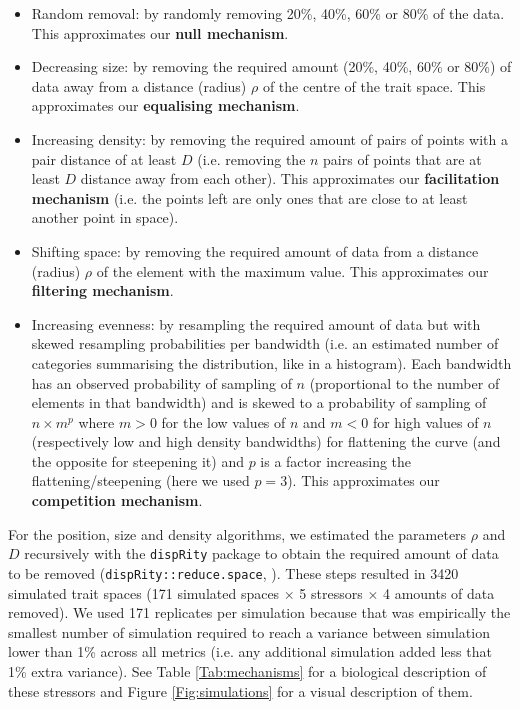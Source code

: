 \documentclass[12pt,letterpaper]{article}
\begin{document}
\begin{itemize}
\item Random removal: by randomly removing 20\%, 40\%, 60\% or 80\% of the data. This approximates our \textbf{null mechanism}.

\item Decreasing size: by removing the required amount (20\%, 40\%, 60\% or 80\%) of data away from a distance (radius)  $\rho$ of the centre of the trait space.
This approximates our \textbf{equalising mechanism}.

\item Increasing density: by removing the required amount of pairs of points with a pair distance of at least $D$ (i.e. removing the $n$ pairs of points that are at least $D$ distance away from each other).
This approximates our \textbf{facilitation mechanism} (i.e. the points left are only ones that are close to at least another point in space).

\item Shifting space: by removing the required amount of data from a distance (radius) $\rho$ of the element with the maximum value.
This approximates our \textbf{filtering mechanism}.

\item Increasing evenness: by resampling the required amount of data but with skewed resampling probabilities per bandwidth (i.e. an estimated number of categories summarising the distribution, like in a histogram).
Each bandwidth has an observed probability of sampling of $n$ (proportional to the number of elements in that bandwidth) and is skewed to a probability of sampling of $n \times m^{p}$ where $m>0$ for the low values of $n$ and $m<0$ for high values of $n$ (respectively low and high density bandwidths) for flattening the curve (and the opposite for steepening it) and $p$ is a factor increasing the flattening/steepening (here we used $p=3$).
This approximates our \textbf{competition mechanism}.
\end{itemize}

For the position, size and density algorithms, we estimated the parameters $\rho$ and $D$ recursively with the \texttt{dispRity} package to obtain the required amount of data to be removed (\texttt{dispRity::reduce.space}, \citealt{guillerme2018disprity,guillerme2020shifting}).
These steps resulted in 3420 simulated trait spaces (171 simulated spaces $\times$ 5 stressors $\times$ 4 amounts of data removed).
We used 171 replicates per simulation because that was empirically the smallest number of simulation required to reach a variance between simulation lower than 1\% across all metrics (i.e. any additional simulation added less that 1\% extra variance).
See Table \ref{Tab:mechanisms} for a biological description of these stressors and Figure \ref{Fig:simulations} for a visual description of them.
\end{document}
